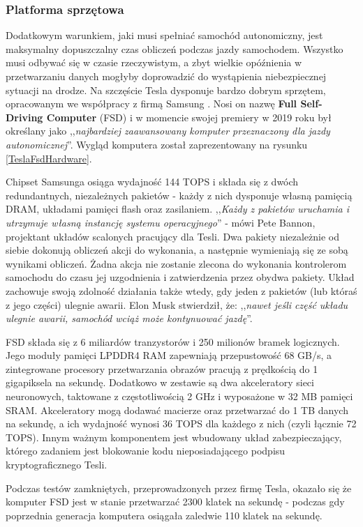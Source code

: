 \subsubsection{Platforma sprzętowa}
Dodatkowym warunkiem, jaki musi spełniać samochód autonomiczny, jest maksymalny dopuszczalny czas obliczeń podczas jazdy samochodem. Wszystko musi odbywać się w czasie rzeczywistym, a zbyt wielkie opóźnienia w przetwarzaniu danych mogłyby doprowadzić do wystąpienia niebezpiecznej sytuacji na drodze. Na szczęście Tesla dysponuje bardzo dobrym sprzętem, opracowanym we współpracy z firmą Samsung \cite{wiggers:teslaDrivingChip, autopilotReview:fsdComputer}. Nosi on nazwę \textbf{Full Self-Driving Computer} (FSD) i w momencie swojej premiery w 2019 roku był określany jako ,,\textit{najbardziej zaawansowany komputer przeznaczony dla jazdy autonomicznej}''. Wygląd komputera został zaprezentowany na rysunku \ref{TeslaFsdHardware}.

Chipset Samsunga osiąga wydajność 144 TOPS i składa się z dwóch redundantnych, niezależnych pakietów - każdy z nich dysponuje własną pamięcią DRAM, układami pamięci flash oraz zasilaniem. ,,\textit{Każdy z pakietów uruchamia i utrzymuje własną instancję systemu operacyjnego}'' - mówi Pete Bannon, projektant układów scalonych pracujący dla Tesli. Dwa pakiety niezależnie od siebie dokonują obliczeń akcji do wykonania, a następnie wymieniają się ze sobą wynikami obliczeń. Żadna akcja nie zostanie zlecona do wykonania kontrolerom samochodu do czasu jej uzgodnienia i zatwierdzenia przez obydwa pakiety. Układ zachowuje swoją zdolność działania także wtedy, gdy jeden z pakietów (lub któraś z jego części) ulegnie awarii. Elon Musk stwierdził, że: ,,\textit{nawet jeśli część układu ulegnie awarii, samochód wciąż może kontynuować jazdę}''.

FSD składa się z 6 miliardów tranzystorów i 250 milionów bramek logicznych. Jego moduły pamięci LPDDR4 RAM zapewniają przepustowość 68 GB/s, a zintegrowane procesory przetwarzania obrazów pracują z prędkością do 1 gigapiksela na sekundę. Dodatkowo w zestawie są dwa akceleratory sieci neuronowych, taktowane z częstotliwością 2 GHz i wyposażone w 32 MB pamięci SRAM. Akceleratory mogą dodawać macierze oraz przetwarzać do 1 TB danych na sekundę, a ich wydajność wynosi 36 TOPS dla każdego z nich (czyli łącznie 72 TOPS). Innym ważnym komponentem jest wbudowany układ zabezpieczający, którego zadaniem jest blokowanie kodu nieposiadającego podpisu kryptograficznego Tesli.

Podczas testów zamkniętych, przeprowadzonych przez firmę Tesla, okazało się że komputer FSD jest w stanie przetwarzać 2300 klatek na sekundę - podczas gdy poprzednia generacja komputera osiągała zaledwie 110 klatek na sekundę. \\


